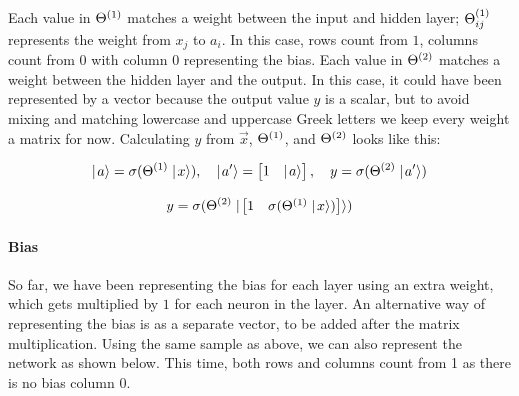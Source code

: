     Each value in $\Theta^{(1)}$ matches a weight between the input and hidden layer; $\Theta^{(1)}_{ij}$ represents the weight from $x_j$ to $a_i$. In this case, rows count from $1$, columns count from $0$ with column $0$ representing the bias. Each value in $\Theta^{(2)}$ matches a weight between the hidden layer and the output. In this case, it could have been represented by a vector because the output value $y$ is a scalar, but to avoid mixing and matching lowercase and uppercase Greek letters we keep every weight a matrix for now. Calculating $y$ from $\vec x$, $\Theta^{(1)}$, and $\Theta^{(2)}$ looks like this:

  $$\mid\! a\rangle = \sigma(\Theta^{(1)}\mid\! x\rangle), \quad \mid\! a^\prime\rangle = \begin{bmatrix} 1 & \mid\! a\rangle\end{bmatrix}, \quad y = \sigma(\Theta^{(2)}\mid\! a^\prime\rangle)$$

  $$y = \sigma(\Theta^{(2)}\mid\! \begin{bmatrix} 1 & \sigma(\Theta^{(1)}\mid\! x\rangle)\end{bmatrix}\rangle)$$

\paragraph{Bias}
  So far, we have been representing the bias for each layer using an extra weight, which gets multiplied by $1$ for each neuron in the layer. An alternative way of representing the bias is as a separate vector, to be added after the matrix multiplication. Using the same sample as above, we can also represent the network as shown below. This time, both rows and columns count from 1 as there is no bias column $0$.

